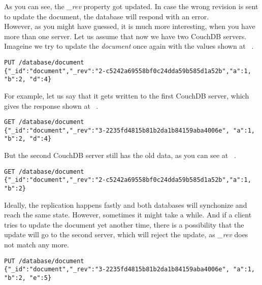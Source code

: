 As you can see, the \textit{\_rev} property got updated. In case the wrong revision is sent to update the document, the database will respond with an error.
\\
However, as you might have guessed, it is much more interesting, when you have more than one server. Let us assume that now we have two CouchDB servers. Imageine we try to update the \textit{document} once again with the values shown at ~.

\begin{lstlisting}[caption={Updating the value of item \textit{document} by adding \textit{d} into it.}, label={lst:rwork4}]
PUT /database/document
{"_id":"document","_rev":"2-c5242a69558bf0c24dda59b585d1a52b","a":1, "b":2, "d":4}
\end{lstlisting}

For example, let us say that it gets written to the first CouchDB server, which gives the response shown at ~.

\begin{lstlisting}[caption={The result of requesting the \textit{document} from CouchDB-1.}, label={lst:rwork5}]
GET /database/document
{"_id":"document","_rev":"3-2235fd4815b81b2da1b84159aba4006e", "a":1, "b":2, "d":4}
\end{lstlisting}

But the second CouchDB server still has the old data, as you can see at ~.

\begin{lstlisting}[caption={The result of requesting the \textit{document} from CouchDB-2.}, label={lst:rwork6}]
GET /database/document
{"_id":"document","_rev":"2-c5242a69558bf0c24dda59b585d1a52b","a":1, "b":2}
\end{lstlisting}

Ideally, the replication happens fastly and both databases will synchonize and reach the same state. However, sometimes it might take a while. And if a client tries to update the document yet another time, there is a possibility that the update will go to the second server, which will reject the update, as \textit{\_rev} does not match any more. 

\begin{lstlisting}[caption={Updating the value of item \textit{document} by adding element \textit{e} and removing previously added element \textit{d}}, label={lst:rwork7}]
PUT /database/document
{"_id":"document","_rev":"3-2235fd4815b81b2da1b84159aba4006e", "a":1, "b":2, "e":5}
\end{lstlisting}


